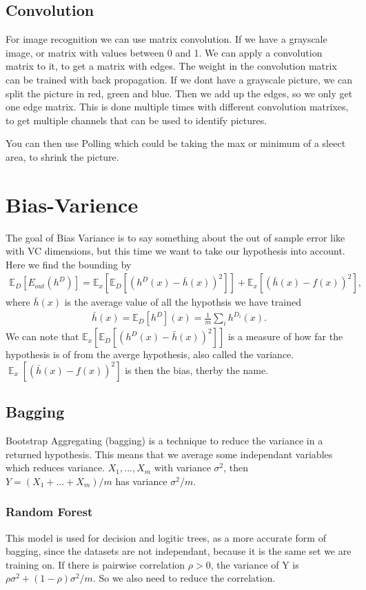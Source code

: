 \documentclass[a4paper,oneside,article]{memoir}
\DeclareMathOperator*{\E}{\mathbb{E}}
\begin{document}
\section{Convolution}
For image recognition we can use matrix convolution. If we have a grayscale image, or matrix with values between 0 and 1.
We can apply a convolution matrix to it, to get a matrix with edges. The weight in the convolution matrix can be trained with back propagation.
If we dont have a grayscale picture, we can split the picture in red, green and blue. Then we add up the edges, so we only get one edge matrix. 
This is done multiple times with different convolution matrixes, to get multiple channels that can be used to identify pictures. 

You can then use Polling which could be taking the max or minimum of a sleect area, to shrink the picture. 


\chapter{Bias-Varience}
The goal of Bias Variance is to say something about the out of sample error like with VC dimensions, 
but this time we want to take our hypothesis into account. 
Here we find the bounding by 
\begin{align*}
    \mathbb{E}_D[E_{out}(h^D)] = \mathbb{E}_x[\mathbb{E}_D[(h^D(x)-\bar{h}(x))^2]]+\mathbb{E}_x[(\bar{h}(x)-f(x))^2],
\end{align*}
where $\bar{h}(x)$ is the average value of all the hypothsis we have trained
\begin{align*}
    \bar{h}(x) = \mathbb{E}_D[h^D](x)= \frac{1}{m}\sum_{i}h^{D_i}(x).
\end{align*}
We can note that $\mathbb{E}_x[\mathbb{E}_D[(h^D(x)-\bar{h}(x))^2]]$ is a measure of how far the hypothesis is of from the averge hypothesis, 
also called the variance. $\E_x[(\bar{h}(x)-f(x))^2]$ is then the bias, therby the name. 

\section{Bagging}
Bootstrap Aggregating (bagging) is a technique to reduce the variance in a returned hypothesis. 
This means that we average some independant variables which reduces variance. 
$X_1,...,X_m$ with variance $σ^2$, then $Y = (X_1 + ... + X_m)/m$ has variance $σ^2/m$. 

\subsection{Random Forest}
This model is used for decision and logitic trees, as a more accurate form of bagging, since the datasets are not independant, because it is the same set we are training on. 
If there is pairwise correlation $ρ>0$, the variance of Y is $ρσ^2+(1-ρ)σ^2/m$. So we also need to reduce the correlation.
\end{document}
